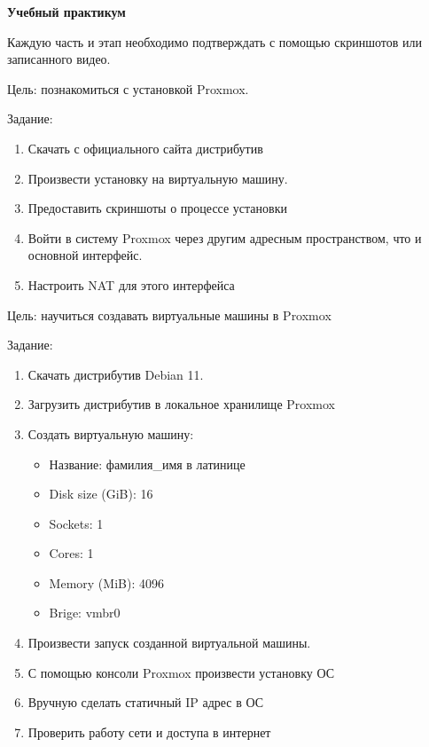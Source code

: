  \hypertarget{app-b}{\label{app-b}}

\textbf{Учебный практикум}

Каждую часть и этап необходимо подтверждать с помощью скриншотов или записанного видео.

Цель: познакомиться с установкой Proxmox.

Задание:
\begin{enumerate}[]
    \item Скачать с официального сайта дистрибутив
    \item Произвести установку на виртуальную машину.
    \item Предоставить скриншоты о процессе установки
    \item Войти в систему Proxmox через другим адресным пространством, что и основной интерфейс.
    \item Настроить NAT для этого интерфейса
\end{enumerate}


Цель: научиться создавать виртуальные машины в Proxmox

Задание:
\begin{enumerate}
    \item Скачать дистрибутив Debian 11.
    \item Загрузить дистрибутив в локальное хранилище Proxmox
    \item Создать виртуальную машину:
    \begin{itemize}
        \item Название: фамилия\_имя в латинице
        \item Disk size (GiB): 16
        \item Sockets: 1
        \item Cores: 1
        \item Memory (MiB): 4096
        \item Brige: vmbr0
    \end{itemize}
    \item Произвести запуск созданной виртуальной машины.
    \item С помощью консоли Proxmox произвести установку ОС
    \item Вручную сделать статичный IP адрес в ОС
    \item Проверить работу сети и доступа в интернет
\end{enumerate}


